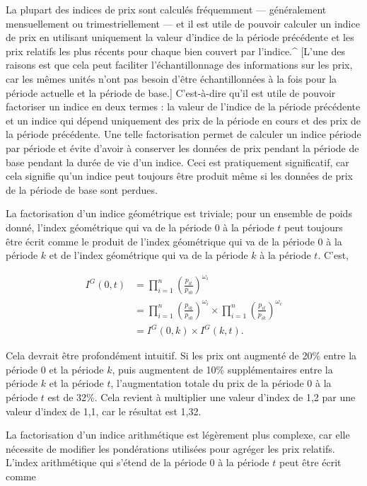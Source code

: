 \documentclass[]{article}
\begin{document}
La plupart des indices de prix sont calculés fréquemment --- généralement mensuellement ou trimestriellement --- et il est utile de pouvoir calculer un indice de prix en utilisant uniquement la valeur d'indice de la période précédente et les prix relatifs les plus récents pour chaque bien couvert par l'indice.\^{} {[}L'une des raisons est que cela peut faciliter l'échantillonnage des informations sur les prix, car les mêmes unités n'ont pas besoin d'être échantillonnées à la fois pour la période actuelle et la période de base.{]} C'est-à-dire qu'il est utile de pouvoir factoriser un indice en deux termes : la valeur de l'indice de la période précédente et un indice qui dépend uniquement des prix de la période en cours et des prix de la période précédente. Une telle factorisation permet de calculer un indice période par période et évite d'avoir à conserver les données de prix pendant la période de base pendant la durée de vie d'un indice. Ceci est pratiquement significatif, car cela signifie qu'un indice peut toujours être produit même si les données de prix de la période de base sont perdues.

La factorisation d'un indice géométrique est triviale; pour un ensemble de poids donné, l'index géométrique qui va de la période 0 à la période \(t\) peut toujours être écrit comme le produit de l'index géométrique qui va de la période 0 à la période \(k\) et de l'index géométrique qui va de la période \(k\) à la période \(t\). C'est,

\begin{align*}
I^{G}(0, t) & = \prod_{i = 1}^{n} \left (\frac{p_{it}}{p_{i0}} \right)^{\omega_i} \\
& = \prod_{i = 1}^{n} \left (\frac{p_{ik}}{p_{i0}} \right)^{\omega_i} \times \prod_{i = 1}^{n } \left (\frac{p_{it}}{p_{ik}} \right)^{\omega_i} \\
& = I^{G}(0, k) \times I^{G}(k, t).
\end{align*}

Cela devrait être profondément intuitif. Si les prix ont augmenté de 20\% entre la période 0 et la période \(k\), puis augmentent de 10\% supplémentaires entre la période \(k\) et la période \(t\), l'augmentation totale du prix de la période 0 à la période \(t\) est de 32\%. Cela revient à multiplier une valeur d'index de 1,2 par une valeur d'index de 1,1, car le résultat est 1,32.

La factorisation d'un indice arithmétique est légèrement plus complexe, car elle nécessite de modifier les pondérations utilisées pour agréger les prix relatifs. L'index arithmétique qui s'étend de la période 0 à la période \(t\) peut être écrit comme
\end{document}
